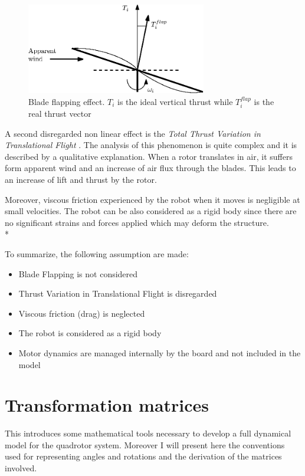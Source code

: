 \begin{figure}[h]
\centering
 \includegraphics[width=0.7\textwidth]{bladeflap.eps}
 \caption[Blade flapping]{Blade flapping effect. $T_i$ is the ideal vertical thrust while $T_i^{flap}$ is the real thrust vector}
 \label{figure:refframes}
\end{figure}
A second disregarded non linear effect is the \textit{Total Thrust Variation in Translational Flight} \cite{Huang2009}. The analysis of this phenomenon is quite complex and it is described by a  qualitative explanation. When a rotor translates in air, it suffers form apparent wind and an increase of air flux through the blades. This leads to an increase of lift and thrust by the rotor.\par
Moreover, viscous friction experienced by the robot when it moves is negligible at small velocities. The robot can be also considered as a rigid body since there are no significant strains and forces applied which may deform the structure. \\*

\noindent
To summarize, the following assumption are made:
\begin{itemize}
\item Blade Flapping is not considered
\item Thrust Variation in Translational Flight is disregarded
\item Viscous friction (drag) is neglected
\item The robot is considered as a rigid body
\item Motor dynamics are managed internally by the board and not included in the model
\end{itemize}

\section{Transformation matrices}
\label{sec:trasfmatrix}
This introduces some mathematical tools necessary to develop a full dynamical model for the quadrotor system. Moreover I will present here the conventions used for representing angles and rotations and the derivation of the matrices involved. \\ 

